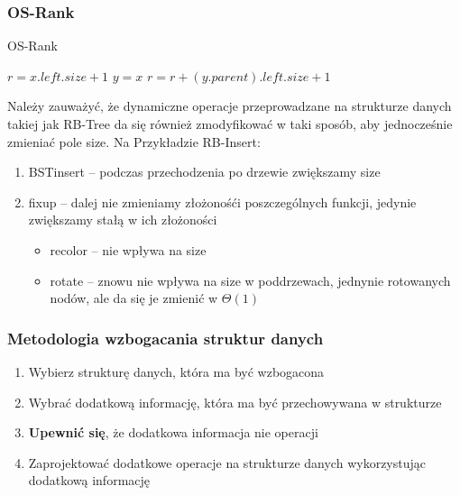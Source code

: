 \documentclass[11pt,a4paper]{article}
\begin{document}
\subsubsection{OS-Rank}
\begin{algorithm}
    \caption{OS-Rank}
    \begin{algorithmic}[1]
            \State $r=x.left.size+1$
            \State $y=x$
            \State $r=r+(y.parent).left.size+1$
            \EndIf
            \EndWhile
        \EndProcedure
    \end{algorithmic}
\end{algorithm}
Należy zauważyć, że dynamiczne operacje przeprowadzane na strukturze danych takiej jak RB-Tree da się również zmodyfikować w taki sposób, aby jednocześnie zmieniać pole size. Na Przykładzie RB-Insert:
\begin{enumerate}
    \item BSTinsert -- podczas przechodzenia po drzewie zwiększamy size
    \item fixup -- dalej nie zmieniamy złożonośći poszczególnych funkcji, jedynie zwiększamy stałą w ich złożoności
        \begin{itemize}
            \item recolor -- nie wpływa na size
            \item rotate -- znowu nie wpływa na size w poddrzewach, jednynie rotowanych nodów, ale da się je zmienić w $\Theta(1)$
        \end{itemize}
\end{enumerate}

\subsubsection{Metodologia wzbogacania struktur danych}
\begin{enumerate}
    \item Wybierz strukturę danych, która ma być wzbogacona
    \item Wybrać dodatkową informację, która ma być przechowywana w strukturze
    \item \textbf{Upewnić się}, że dodatkowa informacja nie  operacji
    \item Zaprojektować dodatkowe operacje na strukturze danych wykorzystując dodatkową informację
\end{enumerate}
\end{document}
